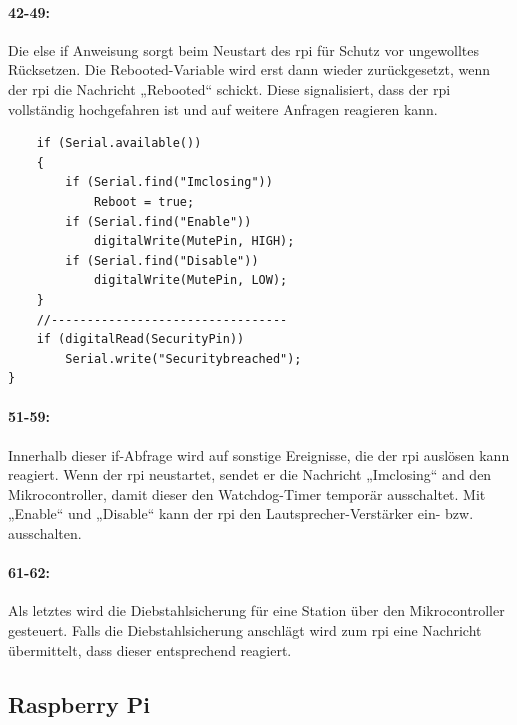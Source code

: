 \paragraph{42-49:}
Die else if Anweisung sorgt beim Neustart des \ac{rpi} für Schutz vor ungewolltes Rücksetzen.
Die Rebooted-Variable wird erst dann wieder zurückgesetzt, wenn der \ac{rpi} die Nachricht „Rebooted“ schickt.
Diese signalisiert, dass der \ac{rpi} vollständig hochgefahren ist und auf weitere Anfragen reagieren kann.

\begin{verbatim}
    if (Serial.available())
    {
        if (Serial.find("Imclosing"))
            Reboot = true;
        if (Serial.find("Enable"))
            digitalWrite(MutePin, HIGH);
        if (Serial.find("Disable"))
            digitalWrite(MutePin, LOW);
    }
    //---------------------------------
    if (digitalRead(SecurityPin))
        Serial.write("Securitybreached");
}
\end{verbatim}

\paragraph{51-59:}
Innerhalb dieser if-Abfrage wird auf sonstige Ereignisse, die der \ac{rpi} auslösen kann reagiert.
Wenn der \ac{rpi} neustartet, sendet er die Nachricht „Imclosing“ and den Mikrocontroller, damit dieser den Watchdog-Timer temporär ausschaltet.
Mit „Enable“ und „Disable“ kann der \ac{rpi} den Lautsprecher-Verstärker ein- bzw. ausschalten.

\paragraph{61-62:}
Als letztes wird die Diebstahlsicherung für eine Station über den Mikrocontroller gesteuert.
Falls die Diebstahlsicherung anschlägt wird zum \ac{rpi} eine Nachricht übermittelt, dass dieser entsprechend reagiert.

\subsection{Raspberry Pi}
